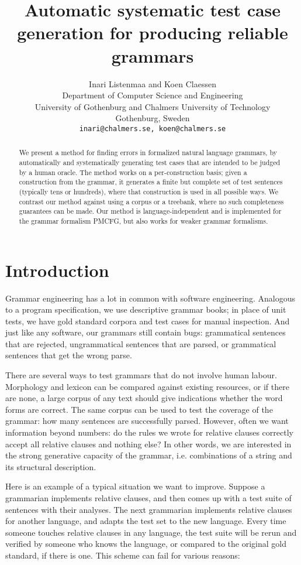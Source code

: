 \documentclass[11pt]{article}
\title{Automatic systematic test case generation for producing reliable grammars}
\author{Inari Listenmaa and Koen Claessen \\
  Department of Computer Science and Engineering \\
  University of Gothenburg and Chalmers University of Technology \\
  Gothenburg, Sweden \\
  {\tt inari@chalmers.se, koen@chalmers.se} }
\date{}
\begin{document}
\maketitle
\begin{abstract}
We present a method for finding errors in formalized natural language grammars, by automatically and systematically generating test cases that are intended to be judged by a human oracle. The method works on a per-construction basis; given a construction from the grammar, it generates a finite but complete set of test sentences (typically tens or hundreds), where that construction is used in all possible ways. We contrast our method against using a corpus or a treebank, where no such completeness guarantees can be made. Our method is language-independent and is implemented for the grammar formalism PMCFG, but also works for weaker grammar formalisms.
\end{abstract}

\section{Introduction}

Grammar engineering has a lot in common with software
engineering. Analogous to a program specification, we use
descriptive grammar books; in place of unit tests, we have gold
standard corpora and test cases for manual inspection.
And just like any software, our grammars still contain bugs:
grammatical sentences that are rejected, ungrammatical
sentences that are parsed, or grammatical sentences that get the wrong
parse.

There are several ways to test grammars that do not involve human
labour. Morphology and lexicon can be compared against existing resources, or
if there are none, a large corpus of any text should give indications
whether the word forms are correct. The same corpus can be used to
test the coverage of the grammar: how many sentences are successfully parsed.
However, often we want information beyond numbers: do the rules we
wrote for relative clauses correctly accept all relative clauses and
nothing else? In other words, we are interested in the strong
generative capacity \cite{chomsky1963} of the grammar, i.e. combinations
of a string and its structural description.

Here is an example of a typical situation we want to improve. Suppose a
grammarian implements relative clauses, and then comes up with a test
suite of sentences with their analyses. The next grammarian implements
relative clauses for another language, and adapts the test set to the
new language. Every time someone touches relative clauses 
in any language, the test suite will be rerun and verified by
someone who knows the language, or compared to the original gold standard, 
if there is one. This scheme can fail for various reasons: 
\end{document}
